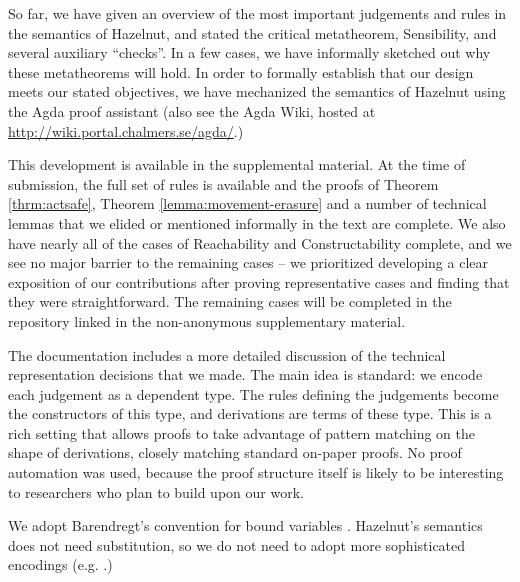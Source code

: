 So far, we have given an overview of the most important judgements and
rules in the semantics of Hazelnut, and stated the critical metatheorem,
Sensibility, and several auxiliary ``checks''. In a few cases, we have
informally sketched out why these metatheorems will hold. In order to
formally establish that our design meets our stated objectives, we have
mechanized the semantics of Hazelnut using the Agda proof
assistant \cite{norell:thesis} (also see the Agda Wiki, hosted
at \url{http://wiki.portal.chalmers.se/agda/}.)

This development is available in the supplemental material. At the time of
submission, the full set of rules is available and the proofs of
Theorem \ref{thrm:actsafe}, Theorem \ref{lemma:movement-erasure} and a
number of technical lemmas that we elided or mentioned informally in the
text are complete. We also have nearly all of the cases of Reachability and
Constructability complete, and we see no major barrier to the remaining
cases -- we prioritized developing a clear exposition of our contributions
after proving representative cases and finding that they were
straightforward. The remaining cases will be completed in the repository
linked in the non-anonymous supplementary material.

The documentation includes a more detailed discussion of the technical
representation decisions that we made. The main idea is standard: we encode
each judgement as a dependent type. The rules defining the judgements
become the constructors of this type, and derivations are terms of these
type. This is a rich setting that allows proofs to take advantage of
pattern matching on the shape of derivations, closely matching standard
on-paper proofs. No proof automation was used, because the proof structure
itself is likely to be interesting to researchers who plan to build upon
our work.

We adopt Barendregt's convention for bound
variables \cite{urban}. Hazelnut's semantics does not need substitution, so
we do not need to adopt more sophisticated encodings
(e.g. \cite{lh09unibind,Pouillard11}.)

